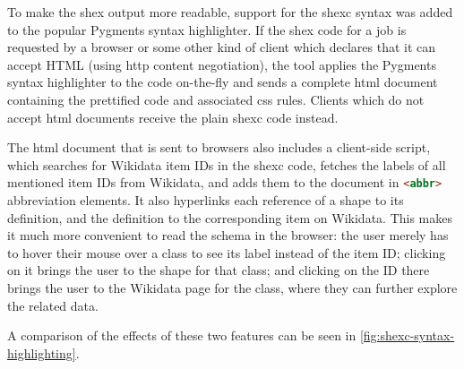 To make the \gls{shex} output more readable,
support for the \gls{shexc} syntax was added to the popular Pygments syntax highlighter. %
If the \gls{shex} code for a job %
is requested by a browser
or some other kind of client which declares that it can accept HTML
(using \gls{http} content negotiation),
the tool applies the Pygments syntax highlighter to the code on-the-fly
and sends a complete \gls{html} document containing the prettified code and associated \gls{css} rules.
Clients which do not accept \gls{html} documents receive the plain \gls{shexc} code instead.

The \gls{html} document that is sent to browsers
also includes a client-side script,
which searches for \gls{Wikidata} \glspl{item ID} in the \gls{shexc} code,
fetches the \glspl{label} of all mentioned \glspl{item ID} from \gls{Wikidata},
and adds them to the document in \lstinline[language=html]{<abbr>} abbreviation elements.
It also hyperlinks each reference of a \gls{shape} to its definition,
and the definition to the corresponding \gls{item} on \gls{Wikidata}.
This makes it much more convenient to read the \gls{schema} in the browser:
the user merely has to hover their mouse over a class to see its \gls{label} instead of the \gls{item ID};
clicking on it brings the user to the \gls{shape} for that class;
and clicking on the ID there brings the user to the \gls{Wikidata} page for the class,
where they can further explore the related data.

A comparison of the effects of these two features
can be seen in \cref{fig:shexc-syntax-highlighting}.

